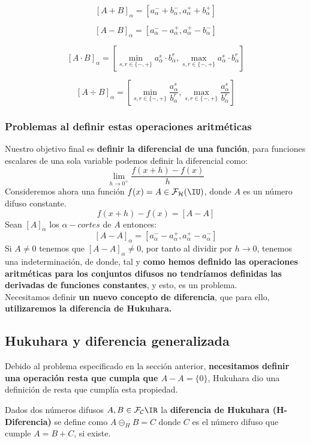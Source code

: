 $$
[A+B]_\alpha = [a_\alpha^- + b_\alpha^-, a_\alpha^+ + b_\alpha^+]
$$

$$
[A-B]_\alpha = [a_\alpha^- - a_\alpha^+, a_\alpha^+ - b_\alpha^-]
$$

$$
[A \cdot B]_\alpha = \left[ \min_{s, r \in \{-, +\}} a_\alpha^s \cdot b_\alpha^r, \max_{s, r \in \{-, +\}} a_\alpha^s \cdot b_\alpha^r\right]
$$

$$
[A \div B]_\alpha = \left[ \min_{s, r \in \{-, +\}} \frac{a_\alpha^s}{b_\alpha^r}, \max_{s, r \in \{-, +\}} \frac{a_\alpha^s}{b_\alpha^r}\right]
$$

\subsubsection{Problemas al definir estas operaciones aritméticas}
Nuestro objetivo final es \textbf{definir la diferencial de una función}, para funciones escalares de una sola variable podemos definir la diferencial como:
$$
\lim\limits_{h\rightarrow 0^+} \frac{f(x+h) - f(x)}{h}
$$
Consideremos ahora una función $f(x)=A\in \mathcal{F}_\mathcal{H}(\IU)$, donde $A$ es un número difuso constante. \\
$$f(x+h) - f(x)=[A-A]$$
Sean $[A]_\alpha$ los $\alpha-cortes$ de $A$ entonces:
$$
[A-A]_\alpha = [a_\alpha^- - a_\alpha^+, a_\alpha^+ - a_\alpha^-]
$$
Si $A\neq 0$ tenemos que $[A-A]_\alpha \neq 0$, por tanto al dividir por $h \longrightarrow 0$, tenemos una indeterminación, de donde, tal y \textbf{como hemos definido las operaciones aritméticas para los conjuntos difusos no tendríamos definidas las derivadas de funciones constantes}, y esto, es un problema. \\
Necesitamos definir \textbf{un nuevo concepto de diferencia}, que para ello, \textbf{utilizaremos la diferencia de Hukuhara.}

\subsection{Hukuhara y diferencia generalizada}
Debido al problema especificado en la sección anterior, \textbf{necesitamos definir una operación resta que cumpla que $A-A=\{0\}$}, Hukuhara dio una definición de resta que cumplía esta propiedad.

\begin{definicion}
	Dados dos números difusos $A, B \in \mathcal{F}_\mathcal{C}\IR$ la \textbf{diferencia de Hukuhara (H-Diferencia)} se define como $A \circleddash_H B = C$ donde $C$ es el número difuso que cumple $A=B+C$, si existe.
\end{definicion}

